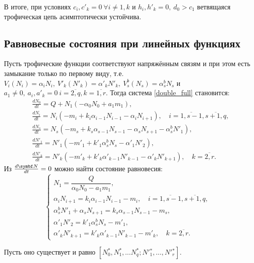 В итоге, при условиях \(c_i, c'_k = 0 ~ \forall i \neq 1, k\) и \( h_i, h'_k = 0, ~ d_0 > c_1\) ветвящаяся трофическая цепь асимптотически устойчива.


\subsection{Равновесные состояния при линейных функциях}
Пусть трофические функции соответствуют напряжённым связям и при этом есть замыкание только по первому виду, т.е. \(V_i(N_i) = \alpha_i N_i, ~ V'_k(N'_k) = \alpha'_k N'_k, ~ V^b_s(N_s) = \alpha^b_s N_s\) и \( a_1 \neq 0, ~ a_i, a'_k = 0 ~ i=\overline{2,q}, k=\overline{1,r}\). Тогда система \eqref{double_full} становится:
\begin{equation} \label{double_lin}
    \begin{split}
        & \frac{d N_0}{dt} = Q + N_1 ( -\alpha_0 N_0 + a_1 m_1 ), \\
        & \frac{d N_i}{dt} = N_i (-m_i + k_i \alpha_{i-1} N_{i-1} - \alpha_i N_{i+1}), \quad i=\overline{1,s-1},  \overline{s+1,q}, \\
        & \frac{d N_s}{dt} = N_s ( -m_s + k_s \alpha_{s-1} N_{s-1} - \alpha_s N_{s+1} - \alpha_s^b N'_1 ), \\
        & \frac{d N'_1}{dt} = N'_1 ( -m'_1 + k'_1 \alpha_s^b N_s - \alpha'_1 N'_{2} ), \\
        & \frac{d N'_k}{dt} = N'_k ( -m'_k + k'_k \alpha'_{k-1} N'_{k-1} - \alpha'_k N'_{k+1} ), \quad k=\overline{2,r}.
    \end{split}
\end{equation}
Из \( \frac{d \mb{N}}{dt} = 0 \) можно найти состояние равновесия:
\begin{equation} \label{double_stab_system}
    \begin{cases}
        N_1 = \dfrac{Q}{ \alpha_0 N_0 - a_1 m_1 }, \\
        \alpha_i N_{i+1} = k_i \alpha_{i-1} N_{i-1} -m_i , \quad i=\overline{1,s-1},  \overline{s+1,q}, \\
        \alpha_s^b N'_1 + \alpha_s N_{s+1} = k_s \alpha_{s-1} N_{s-1} -m_s, \\
        \alpha'_1 N'_{2} = k'_1 \alpha_s^b N_s -m'_1, \\
        \alpha'_k N'_{k+1} = k'_k \alpha'_{k-1} N'_{k-1} -m'_k, \quad k=\overline{2,r}.
    \end{cases}
\end{equation}

Пусть оно существует и равно \( [N^*_0, N^*_1, \dots N^*_q; N'{}^*_1, \dots, N'{}^*_r] \).

